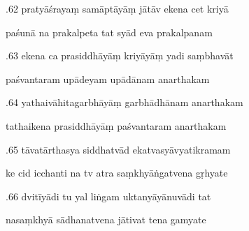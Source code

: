 \documentclass[article,12pt,a4paper]{memoir}%
\newcounter{parCount}
\begin{document}
	  
	  \pstart {}.62 pratyāśrayaṃ samāptāyāṃ jātāv ekena cet kriyā 
	{}
	\pend%
      

	  
	  \pstart \leavevmode%
	paśunā na prakalpeta tat syād eva prakalpanam 
	{}
	\pend%
      

	  
	  \pstart {}.63 ekena ca prasiddhāyāṃ kriyāyāṃ yadi saṃbhavāt 
	{}
	\pend%
      

	  
	  \pstart \leavevmode%
	paśvantaram upādeyam upādānam anarthakam 
	{}
	\pend%
      

	  
	  \pstart {}.64 yathaivāhitagarbhāyāṃ garbhādhānam anarthakam 
	{}
	\pend%
      

	  
	  \pstart \leavevmode%
	tathaikena prasiddhāyāṃ paśvantaram anarthakam 
	{}
	\pend%
      

	  
	  \pstart {}.65 tāvatārthasya siddhatvād   ekatvasyāvyatikramam 
	{}
	\pend%
      

	  
	  \pstart \leavevmode%
	ke cid icchanti na tv atra saṃkhyāṅgatvena gṛhyate 
	{}
	\pend%
      

	  
	  \pstart {}.66 dvitīyādi tu yal liṅgam uktanyāyānuvādi tat 
	{}
	\pend%
      

	  
	  \pstart \leavevmode%
	nasaṃkhyā sādhanatvena jātivat tena gamyate 
	{}
	\pend%
      
\end{document}
